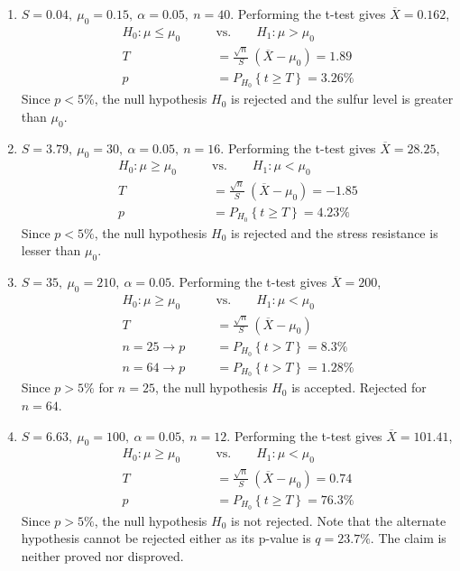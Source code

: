 \begin{enumerate}
	\item $ S = 0.04,\ \mu_0 = 0.15,\ \alpha = 0.05,\ n = 40$. Performing the t-test gives $ \overline{X} = 0.162 $,
	\begin{align}
		H_0 : \mu \leq \mu_0 \qquad &\text{vs.} \qquad H_1 : \mu > \mu_0 \nonumber \\
		T &= \frac{\sqrt{n}}{S}\ (\overline{X} - \mu_0) = 1.89 \nonumber \\
		p &= P_{H_0}\left\{t \geq T\right\} = 3.26\% 
	\end{align}
	Since $ p < 5\% $, the null hypothesis $ H_0 $ is rejected and the sulfur level is greater than $ \mu_0 $.
	
	\item $ S = 3.79,\ \mu_0 = 30,\ \alpha = 0.05,\ n = 16$. Performing the t-test gives $ \overline{X} = 28.25 $,
	\begin{align}
		H_0 : \mu \geq \mu_0 \qquad &\text{vs.} \qquad H_1 : \mu < \mu_0 \nonumber \\
		T &= \frac{\sqrt{n}}{S}\ (\overline{X} - \mu_0) = -1.85 \nonumber \\
		p &= P_{H_0}\left\{t \geq T\right\} = 4.23\% 
	\end{align}
	Since $ p < 5\% $, the null hypothesis $ H_0 $ is rejected and the stress resistance is lesser than $ \mu_0 $.
	
	\item $ S = 35,\ \mu_0 = 210,\ \alpha = 0.05$. Performing the t-test gives $ \overline{X} = 200 $,
	\begin{align}
		H_0 : \mu \geq \mu_0 \qquad &\text{vs.} \qquad H_1 : \mu < \mu_0 \nonumber \\
		T &= \frac{\sqrt{n}}{S}\ (\overline{X} - \mu_0) \nonumber \\
		n = 25 \to p &= P_{H_0}\left\{t > T\right\} = 8.3\% \nonumber \\
		n = 64 \to p &= P_{H_0}\left\{t > T\right\} = 1.28\% 
	\end{align}
	Since $ p > 5\% $ for $ n = 25 $, the null hypothesis $ H_0 $ is accepted. Rejected for $ n = 64 $.
	
	\item $ S = 6.63,\ \mu_0 = 100,\ \alpha = 0.05,\ n = 12$. Performing the t-test gives $ \overline{X} = 101.41 $,
	\begin{align}
		H_0 : \mu \geq \mu_0 \qquad &\text{vs.} \qquad H_1 : \mu < \mu_0 \nonumber \\
		T &= \frac{\sqrt{n}}{S}\ (\overline{X} - \mu_0) = 0.74 \nonumber \\
		p &= P_{H_0}\left\{t \geq T\right\} = 76.3\% 
	\end{align}
	Since $ p > 5\% $, the null hypothesis $ H_0 $ is not rejected. Note that the alternate hypothesis cannot be rejected either as its p-value is $ q = 23.7\% $. The claim is neither proved nor disproved.
	

\end{enumerate}
